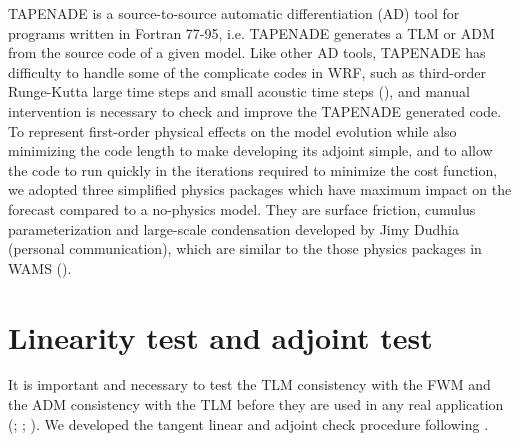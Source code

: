\documentclass[12pt]{article}
\begin{document}
TAPENADE is a source-to-source automatic differentiation (AD) tool for programs written in Fortran 77-95, i.e. TAPENADE generates a TLM or ADM from the source code of a given model. Like other AD tools, TAPENADE has difficulty to handle some of the complicate codes in WRF, such as third-order Runge-Kutta large time steps and small acoustic time steps (\cite{Xiao2008}), and manual intervention is necessary to check and improve the TAPENADE generated code. To represent first-order physical effects on the model evolution while also minimizing the code length to make developing its adjoint simple, and to allow the code to run quickly in the iterations required to minimize the cost function, we adopted three simplified physics packages which have maximum impact on the forecast compared to a no-physics model. They are surface friction, cumulus parameterization and large-scale condensation developed by Jimy Dudhia (personal communication), which are similar to the those physics packages in WAMS (\cite{Xiao2008}).

\section{Linearity test and adjoint test}

It is important and necessary to test the TLM consistency with the FWM and the ADM consistency with the TLM before they are used in any real application (\cite{Vukicevic1991}; \cite{Errico1992}; \cite{Gilmour2001}). We developed the tangent linear and adjoint check procedure following \cite{Navon1992}.
\end{document}
